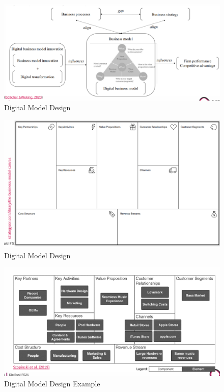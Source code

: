 \documentclass[../Main.tex]{subfiles}
\begin{document}
\begin{figure}[H]
    \centering
    \includegraphics[width=1\linewidth]{Images/digbus/modeldesign.png}
    \caption{Digital Model Design}
\end{figure}
\begin{figure}[H]
    \centering
    \includegraphics[width=1\linewidth]{Images/digbus/modeldesigncanvas.png}
    \caption{Digital Model Design}
\end{figure}
\begin{figure}[H]
    \centering
    \includegraphics[width=1\linewidth]{Images/digbus/modeldesignexample.png}
    \caption{Digital Model Design Example}
\end{figure}
\end{document}
